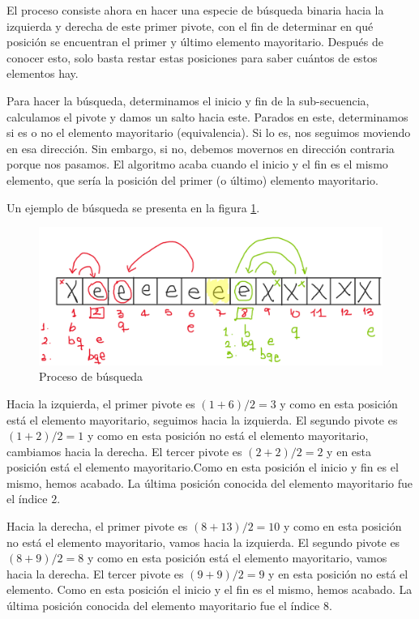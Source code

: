 \documentclass[letter]{article}
\begin{document}
El proceso consiste ahora en hacer una especie de búsqueda binaria hacia la izquierda y derecha de este primer pivote, con el fin de determinar en qué posición se encuentran el primer y último elemento mayoritario. Después de conocer esto, solo basta restar estas posiciones para saber cuántos de estos elementos hay. \par

Para hacer la búsqueda, determinamos el inicio y fin de la sub-secuencia, calculamos el pivote y damos un salto hacia este. Parados en este, determinamos si es o no el elemento mayoritario (equivalencia). Si lo es, nos seguimos moviendo en esa dirección. Sin embargo, si no, debemos movernos en dirección contraria porque nos pasamos. El algoritmo acaba cuando el inicio y el fin es el mismo elemento, que sería la posición del primer (o último) elemento mayoritario. \par

Un ejemplo de búsqueda se presenta en la figura \ref{fig:busqueda}. 

\begin{figure}[!ht]
\centering
\includegraphics[scale=0.2]{img/fig2.png}
\vspace{-1em}
\caption{Proceso de búsqueda}
\label{fig:busqueda}
\end{figure}

Hacia la izquierda, el primer pivote es $(1+6)/2=3$ y como en esta posición está el elemento mayoritario, seguimos hacia la izquierda. El segundo pivote es $(1+2)/2=1$ y como en esta posición no está el elemento mayoritario, cambiamos hacia la derecha. El tercer pivote es $(2+2)/2=2$ y en esta posición está el elemento mayoritario.Como en esta posición el inicio y fin es el mismo, hemos acabado. La última posición conocida del elemento mayoritario fue el índice $2$. \par

Hacia la derecha, el primer pivote es $(8+13)/2=10$ y como en esta posición no está el elemento mayoritario, vamos hacia la izquierda. El segundo pivote es $(8+9)/2=8$ y como en esta posición está el elemento mayoritario, vamos hacia la derecha. El tercer pivote es $(9+9)/2=9$ y en esta posición no está el elemento. Como en esta posición el inicio y el fin es el mismo, hemos acabado. La última posición conocida del elemento mayoritario fue el índice $8$. \par
\end{document}
